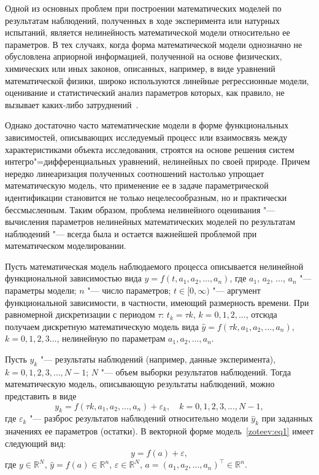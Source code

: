 \renewcommand{\JournalDataOnline}{\displaydate{zoteeve}}


\makerutitle


Одной из основных проблем при построении математических моделей по результатам наблюдений, полученных в ходе эксперимента или натурных испытаний, является нелинейность математической модели относительно ее параметров. В тех случаях, когда форма математической модели однозначно не обусловлена априорной информацией, полученной на основе физических, химических или иных законов, описанных, например, в виде уравнений математической физики, широко используются линейные регрессионные модели, оценивание и статистический анализ параметров которых, как правило, не вызывает каких-либо затруднений~\cite{zot:1,zot:2,zot:3}.

Однако достаточно часто математические модели в форме функциональных зависимостей, описывающих исследуемый процесс или взаимосвязь между характеристиками объекта исследования, строятся на основе решения систем интегро"=дифференциальных уравнений, нелинейных по своей природе. Причем нередко линеаризация полученных соотношений настолько упрощает математическую модель, что применение ее в задаче параметрической идентификации становится не только нецелесообразным, но и практически бессмысленным. Таким образом, проблема нелинейного оценивания "--- вычисления параметров нелинейных математических моделей по результатам наблюдений "--- всегда была и остается важнейшей проблемой при математическом моделировании.

Пусть математическая модель наблюдаемого процесса описывается нелинейной функциональной зависимостью вида  $\hat{y}=f(t,a_1,a_2, \dots, a_n)$, где $a_1$, $a_2$, $\dots$, $a_n$ "--- параметры модели;  $n$ "--- число параметров;  $t \in [0,\infty)$ "--- аргумент функциональной зависимости, в частности, имеющий размерность времени. При равномерной дискретизации с периодом  $\tau$: $t_k=\tau k$, $k=0,1,2, \dots$, отсюда получаем дискретную математическую модель вида  $\hat{y}=f(\tau k,a_1,a_2, \dots, a_n)$, $k=0,1,2,3 \dots$, нелинейную по параметрам  $a_1,a_2, \dots, a_n$.

 

Пусть  $y_k$ "--- результаты наблюдений (например, данные эксперимента), \linebreak $k=0,1,2,3,\dots, N-1$;  $N$ "--- объем выборки результатов наблюдений. Тогда математическую модель, описывающую результаты наблюдений, можно представить в виде
\begin{equation}
y_k=f(\tau k, a_1, a_2, \dots, a_n)+\varepsilon_k, \quad k=0,1,2,3, \dots, N-1,
\label{zoteev:eq1}
\end{equation}
где  $\varepsilon_k$ "--- разброс результатов наблюдений относительно модели $\hat{y}_k$  при заданных значениях ее параметров (остатки). В векторной форме модель~\eqref{zoteev:eq1} имеет следующий вид: 
$$y=f(a)+\varepsilon,$$ 
где $y \in \mathbb R^N$, $\hat{y}=f(a) \in \mathbb  R^n$, $\varepsilon \in \mathbb  R^N$, $a=(a_1,a_2, \dots, a_n)^{\top} \in \mathbb  R^n$.

